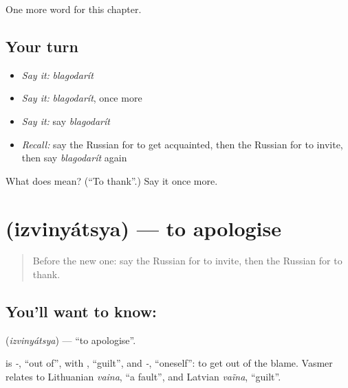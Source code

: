 \begin{grammarlens}[title={What you've built}]
One more word for this chapter.
\end{grammarlens}

\subsection*{Your turn}
\begin{itemize}
\raggedright
  \item \emph{Say it:} \emph{blagodarít}
  \item \emph{Say it:} \emph{blagodarít}, once more
  \item \emph{Say it:} say \emph{blagodarít}
  \item \emph{Recall:} say the Russian for to get acquainted, then the Russian for to invite, then say \emph{blagodarít} again
\end{itemize}

\begin{tcolorbox}[breakable,colback=teal!4,colframe=teal!35!black,title={Before you move on}]
What does  mean? (\textquotedblleft{}To thank\textquotedblright{}.) Say it once more.
\end{tcolorbox}
\section[\texorpdfstring{\ru{извиняться} (izvinyátsya)}{извиняться (izvinyátsya)}]{ (izvinyátsya) — to apologise}

\label{lesson:RU-C141-izvinyatsya}



\begin{quote}
Before the new one: say the Russian for to invite, then the Russian for to thank.
\end{quote}

\subsection*{You'll want to know: }
\textbf{} (\emph{izvinyátsya}) — \textquotedblleft{}to apologise\textquotedblright{}.

\begin{cousinweb}
\textbf{} is \emph{-}, \textquotedblleft{}out of\textquotedblright{}, with \emph{}, \textquotedblleft{}guilt\textquotedblright{}, and \emph{-}, \textquotedblleft{}oneself\textquotedblright{}: to get out of the blame. Vasmer relates \emph{} to Lithuanian \emph{vaina}, \textquotedblleft{}a fault\textquotedblright{}, and Latvian \emph{vaĩna}, \textquotedblleft{}guilt\textquotedblright{}.
\end{cousinweb}

